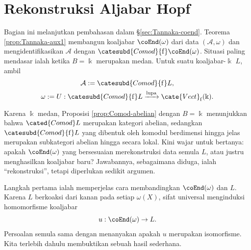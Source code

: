 
\section{Rekonstruksi Aljabar Hopf}\label{sec:Hopf-reconstruction}
Bagian ini melanjutkan pembahasan dalam \S\ref{sec:Tannaka-coend}. Teorema
\ref{prop:Tannaka-aux1} membangun koaljabar $\coEnd(\omega)$ dari data
$(\mathcal{A}, \omega)$ dan mengidentifikasikan $\mathcal{A}$ dengan
$\catesubd{Comod}{\mathrm{f}}\coEnd(\omega)$. Situasi paling mendasar ialah
ketika $B = \Bbbk$ merupakan medan. Untuk suatu koaljabar-$\Bbbk$ $L$, ambil
\begin{gather*}
	\mathcal{A} := \catesubd{Comod}{\mathrm{f}}L , \\
	\omega := U: \catesubd{Comod}{\mathrm{f}}L \xrightarrow{\text{lupa}} \cate{Vect}_{\mathrm{f}}(\Bbbk).
\end{gather*}

Karena $\Bbbk$ medan, Proposisi \ref{prop:Comod-abelian} dengan $B = \Bbbk$
menunjukkan bahwa $\cated{Comod}L$ merupakan kategori abelian, sedangkan
$\catesubd{Comod}{\mathrm{f}}L$ yang dibentuk oleh komodul berdimensi hingga
jelas merupakan subkategori abelian hingga secara lokal. Kini wajar untuk bertanya:
apakah $\coEnd(\omega)$ yang bersesuaian merekonstruksi data semula $L$, atau
justru menghasilkan koaljabar baru? Jawabannya, sebagaimana diduga, ialah
``rekonstruksi'', tetapi diperlukan sedikit argumen.

Langkah pertama ialah memperjelas cara membandingkan $\coEnd(\omega)$ dan
$L$. Karena $L$ berkoaksi dari kanan pada setiap $\omega(X)$, sifat universal
menginduksi homomorfisme koaljabar
\begin{equation}\label{eqn:u-comparison}
	u: \coEnd(\omega) \to L.
\end{equation}
Persoalan semula sama dengan menanyakan apakah $u$ merupakan isomorfisme.
Kita terlebih dahulu membuktikan sebuah hasil sederhana.

